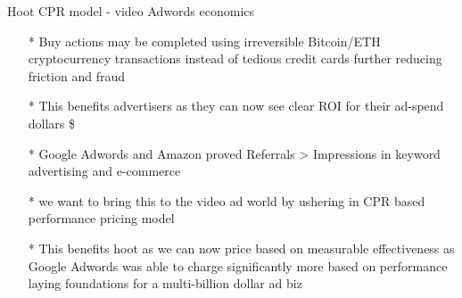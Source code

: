 \documentclass[12pt]{beamer}
\begin{document}
\begin{frame}[t]{Hoot CPR model - video Adwords economics}
\begin{itemize}[<+-| alert@+>]

\item[*]Buy actions may be completed using irreversible  Bitcoin/ETH cryptocurrency transactions instead of tedious credit cards further reducing friction and fraud
\item[*]This benefits advertisers as they can now see clear ROI for their ad-spend dollars \$
\item[*]Google Adwords and Amazon proved Referrals > Impressions in keyword advertising and e-commerce
\item[*]we want to bring this to the video ad world by ushering in CPR based performance pricing model
\item[*]This benefits hoot as we can now price based on measurable effectiveness as Google Adwords was able to charge significantly more based on performance laying foundations for a multi-billion dollar ad biz

\end{itemize}
\end{frame}
\end{document}
